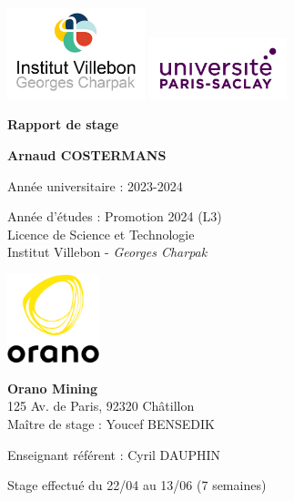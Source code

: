 \begin{titlepage}
    \centering
    
    \includegraphics[width=0.3\textwidth]{img/logo/logo_institut.jpeg} \includegraphics[width=0.3\textwidth]{img/logo/UPSaclay.jpg}

    \vspace{1.5cm}
    {\LARGE\textbf{Rapport de stage}\par}
    
    \vspace{1.5cm}
    {\large\textbf{Arnaud COSTERMANS}\par}
    
    \vspace{0.5cm}
    Année universitaire : 2023-2024
    
    \vspace{0.5cm}
    Année d'études : Promotion 2024 (L3) \\
    Licence de Science et Technologie \\
    Institut Villebon - \textit{Georges Charpak}
    
    \vspace{2cm}
    \includegraphics[width=0.2\textwidth]{img/logo/logo-orano.png}
    
    \vspace{0.5cm}
    \textbf{Orano Mining}\\
    125 Av. de Paris, 92320 Châtillon\\
    \vspace{0.5cm}
    Maître de stage : Youcef BENSEDIK
    
    \vspace{0.5cm}
    Enseignant référent : Cyril DAUPHIN
    
    \vspace{0.5cm}
    Stage effectué du 22/04 au 13/06 (7 semaines)
\end{titlepage}
\clearpage